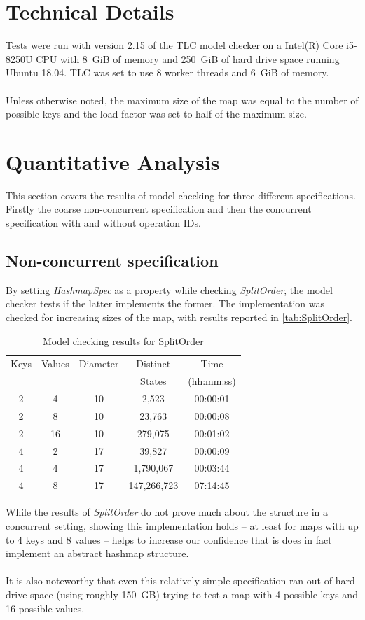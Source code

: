 \documentclass{uit-thesis}
\begin{document}
\section{Technical Details}\label{sec:tech-details}
Tests were run with version 2.15 of the TLC model checker on a Intel(R) Core i5-8250U CPU with 8~GiB of memory and 250~GiB of hard drive space running Ubuntu 18.04. TLC was set to use 8 worker threads and 6~GiB of memory.
\\\\
Unless otherwise noted, the maximum size of the map was equal to the number of possible keys and the load factor was set to half of the maximum size.

\section{Quantitative Analysis}
This section covers the results of model checking for three different specifications. Firstly the coarse non-concurrent specification and then the concurrent specification with and without operation IDs.

\subsection{Non-concurrent specification}
By setting \textit{HashmapSpec} as a property while checking \textit{SplitOrder}, the model checker tests if the latter implements the former. The implementation was checked for increasing sizes of the map, with results reported in \autoref{tab:SplitOrder}.
\begin{table}[h]
    \centering
    \begin{tabular}{ |c|c||c|c|c| }
        \hline
        Keys & Values & Diameter & Distinct & Time \\
        &        &          & States   & (hh:mm:ss)\\
        \hline
        2 & 4  & 10 & 2,523      & 00:00:01\\
        2 & 8  & 10 & 23,763     & 00:00:08\\
        2 & 16 & 10 & 279,075    & 00:01:02\\
        4 & 2  & 17 & 39,827     & 00:00:09\\
        4 & 4  & 17 & 1,790,067  & 00:03:44\\
        4 & 8  & 17 & 147,266,723& 07:14:45\\
        \hline
    \end{tabular}
    \caption{Model checking results for SplitOrder}
    \label{tab:SplitOrder}
\end{table}
While the results of \textit{SplitOrder} do not prove much about the structure in a concurrent setting, showing this implementation holds -- at least for maps with up to 4 keys and 8 values -- helps to increase our confidence that is does in fact implement an abstract hashmap structure.
\\\\
It is also noteworthy that even this relatively simple specification ran out of hard-drive space (using roughly 150~GB) trying to test a map with 4 possible keys and 16 possible values.
\end{document}
